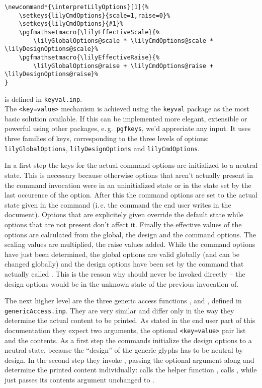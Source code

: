 \documentclass{article}
\begin{document}
\begin{verbatim}
\newcommand*{\interpretLilyOptions}[1]{%
    \setkeys{lilyCmdOptions}{scale=1,raise=0}%
    \setkeys{lilyCmdOptions}{#1}%
    \pgfmathsetmacro{\lilyEffectiveScale}{%
        \lilyGlobalOptions@scale * \lilyCmdOptions@scale * \lilyDesignOptions@scale}%
    \pgfmathsetmacro{\lilyEffectiveRaise}{%
        \lilyGlobalOptions@raise + \lilyCmdOptions@raise + \lilyDesignOptions@raise}%
}
\end{verbatim}
 is defined in \texttt{keyval.inp}.\\
The \texttt{<key=value>} mechanism is achieved using the \texttt{keyval} package as the most basic solution available.
{\color{red} If this can be implemented more elegant, extensible or powerful using other packages, e.\,g.\ \texttt{pgfkeys}, we'd appreciate any input.}
It uses three families of keys, corresponding to the three levels of options:
\texttt{lilyGlobalOptions}, \texttt{lilyDesignOptions} and \texttt{lilyCmdOptions}.

In a first step the keys for the actual command options are initialized to a neutral state.
This is necessary because otherwise options that aren't actually present in the command invocation were in an uninitialized state or in the state set by the last occurence of the option.
After this the command options are set to the actual state given in the command (i.\,e. the command the end user writes in the document).
Options that are explicitely given override the default state while options that are not present don't affect it.
Finally the effective values of the options are calculated from the global, the design and the command options. 
The scaling values are multiplied, the raise values added.
While the command options have just been determined, the global options are valid globally (and can be changed globally) and the design options have been set by the command that actually called .
This is the reason why  should never be invoked directly -- the design options would be in the unknown state of the previous invocation of.

\medskip
The next higher level are the three generic access functions ,  and , defined in \texttt{genericAccess.inp}.
They are very similar and differ only in the way they determine the actual content to be printed.
As stated in the end user part of this documentation they expect two arguments, the optional \texttt{<key=value>} pair list and the contents.
As a first step the commands initialize the design options to a neutral state, because the \enquote{design} of the generic glyphs has to be neutral by design.
In the second step they invoke , passing the optional argument along and determine the printed content individually:
 calls the helper function ,  calls , while  just passes its contents argument unchanged to .
\end{document}
